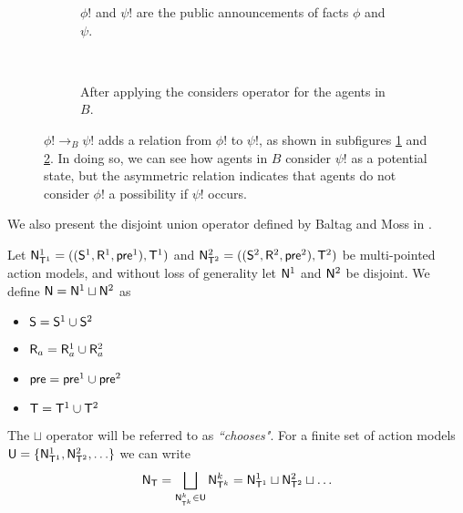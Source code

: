 \begin{figure}
\centering
\begin{subfigure}[b]{.45\textwidth}
\centering
{}
\caption{$\phi!$ and $\psi!$ are the public announcements of facts $\phi$ and $\psi$.}
\label{subfigure:beforeConsiders}
\end{subfigure}
~
\begin{subfigure}[b]{.45\textwidth}
\centering
{}
\caption{After applying the considers operator for the agents in $B$.}
\label{subfigure:afterConsiders}
\end{subfigure}
\caption[Applying the considers operator]{$\phi! \to_B \psi!$ adds a relation from $\phi!$
to $\psi!$, as shown in subfigures \ref{subfigure:beforeConsiders} and
\ref{subfigure:afterConsiders}. In doing so, we can see how agents in $B$ consider $\psi!$ as a
potential state, but the asymmetric relation indicates that agents do not consider $\phi!$ a
possibility if $\psi!$ occurs.}
\label{figure:considersExample}
\end{figure}

We also present the disjoint union operator defined by Baltag and Moss in \cite{baltag2005programs}.

\begin{defn} \label{disjoint}
	Let $\mathrm{\mathsf{N}}^1_{\mathrm{\mathsf{T}}^1} = ((\mathrm{\mathsf{S}}^1, \mathrm{\mathsf{R}}^1, \mathrm{\mathsf{pre}}^1), \mathrm{\mathsf{T}}^1)$ and $\mathrm{\mathsf{N}}^2_{\mathrm{\mathsf{T}}^2} = ((\mathrm{\mathsf{S}}^2,
	\mathrm{\mathsf{R}}^2, \mathrm{\mathsf{pre}}^2),\mathrm{\mathsf{T}}^2)$ be multi-pointed action models, and without loss of generality let $\mathrm{\mathsf{N}}^1$ and
$\mathrm{\mathsf{N}}^2$ be disjoint.
We define $\mathrm{\mathsf{N}} = \mathrm{\mathsf{N}}^1 \sqcup \mathrm{\mathsf{N}}^2$ as
\begin{itemize}
	\item $\mathrm{\mathsf{S}} = \mathrm{\mathsf{S}}^1 \cup \mathrm{\mathsf{S}}^2$
	\item $\mathrm{\mathsf{R}}_a = \mathrm{\mathsf{R}}^1_a \cup \mathrm{\mathsf{R}}^2_a$
	\item $\mathrm{\mathsf{pre}} = \mathrm{\mathsf{pre}}^1 \cup \mathrm{\mathsf{pre}}^2$
	\item $\mathrm{\mathsf{T}} = \mathrm{\mathsf{T}}^1 \cup \mathrm{\mathsf{T}}^2$
\end{itemize}
The $\sqcup$ operator will be referred to as {\em ``chooses"}.
For a finite set of action models $\mathrm{\mathsf{U}} = \{ \mathrm{\mathsf{N}}^1_{\mathrm{\mathsf{T}}^1}, \mathrm{\mathsf{N}}^2_{\mathrm{\mathsf{T}}^2}, \ldots \}$ we can write
\[
	\mathrm{\mathsf{N}}_\mathrm{\mathsf{T}} = \bigsqcup_{\mathrm{\mathsf{N}}^k_{\mathrm{\mathsf{T}}^k} \in \mathrm{\mathsf{U}}} \mathrm{\mathsf{N}}^k_{\mathrm{\mathsf{T}}^k} = \mathrm{\mathsf{N}}^1_{\mathrm{\mathsf{T}}^1} \sqcup
	\mathrm{\mathsf{N}}^2_{\mathrm{\mathsf{T}}^2} \sqcup \ldots
\]
\end{defn}


